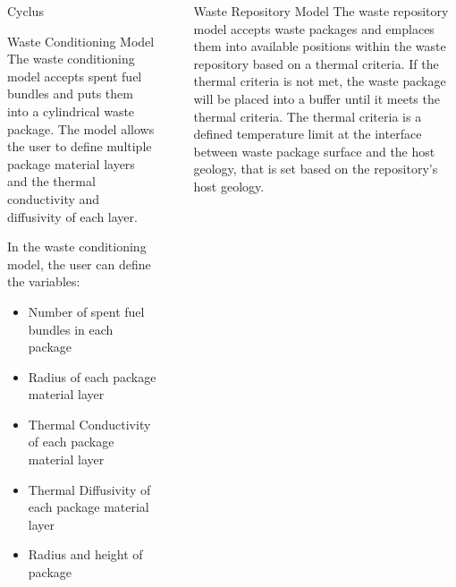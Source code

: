 \documentclass[final]{beamer}
\newlength{\sepwid}
\newlength{\onecolwid}
\newlength{\threecolwid}
\begin{document}
\begin{frame}[t]
\begin{columns}[t,totalwidth=\threecolwid]
\begin{column}{\onecolwid}
\begin{block}{Cyclus}
\end{block}

\begin{block}{Waste Conditioning Model}
The waste conditioning model accepts spent fuel bundles and puts them into a cylindrical
waste package. 
The model allows the user to define multiple package material layers and 
the thermal conductivity and diffusivity of each layer. 
	
In the waste conditioning model, the user can define the variables:  
	\begin{itemize}
		\item Number of spent fuel bundles in each package 
		\item Radius of each package material layer
		\item Thermal Conductivity of each package material layer 
		\item Thermal Diffusivity of each package material layer
		\item Radius and height of package
	\end{itemize}
	
\end{block}


\end{column} %

\begin{column}{\sepwid}\end{column} %



\begin{column}{\onecolwid} %

\begin{block}{Waste Repository Model}
The waste repository model accepts waste packages and emplaces them into 
available positions within the waste repository based on a thermal criteria. 
If the thermal criteria is not met, the waste package will be placed into a buffer 
until it meets the thermal criteria. 
The thermal criteria is a defined temperature limit at the interface between waste 
package surface and the host geology, that is set based on the repository's host geology.


\end{block}
\end{column}
\end{columns}
\end{frame}
\end{document}

